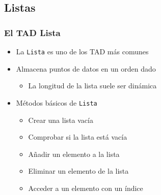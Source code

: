 \documentclass[11pt]{beamer}
\begin{document}
\subsection{Listas}

\begin{frame}\frametitle{El TAD Lista}
\begin{itemize}
\item La \texttt{Lista} es uno de los TAD más comunes
\item Almacena puntos de datos en un orden dado
    \begin{itemize}
    \item La longitud de la lista suele ser dinámica
    \end{itemize}
\item Métodos básicos de \texttt{Lista}
    \begin{itemize}
    \item Crear una lista vacía
    \item Comprobar si la lista está vacía
    \item Añadir un elemento a la lista
    \item Eliminar un elemento de la lista
    \item Acceder a un elemento con un índice
    \end{itemize}
\end{itemize}
\vspace{0.4cm}
\begin{center}
\end{center}
\end{frame}
\end{document}
